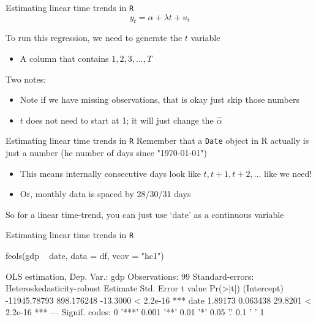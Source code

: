\documentclass[aspectratio=169,t,11pt,table]{beamer}
\begin{document}

\begin{frame}[fragile]{Estimating linear time trends in \texttt{R}}
  \vspace*{-\bigskipamount}
  $$
    y_t = \alpha + \lambda t + u_t
  $$

  To run this regression, we need to generate the $t$ variable
  \begin{itemize}
    \item A column that contains $1, 2, 3, \dots, T$
  \end{itemize}

  \bigskip
  Two notes:
  \begin{itemize}
    \item Note if we have missing observations, that is okay just skip those numbers 
    \item $t$ does not need to start at 1; it will just change the $\hat{\alpha}$
  \end{itemize}
\end{frame}

\begin{frame}[fragile]{Estimating linear time trends in \texttt{R}}
  Remember that a \texttt{Date} object in R actually is just a number (he number of days since "1970-01-01")
  \begin{itemize}
    \item This means internally consecutive days look like $t, t+1, t+2, \dots$ like we need! 
    \item Or, monthly data is spaced by 28/30/31 days
  \end{itemize}

  \bigskip
  So for a linear time-trend, you can just use `date' as a continuous variable
\end{frame}

\begin{frame}[fragile]{Estimating linear time trends in \texttt{R}}

  \begin{codeblock}
feols(gdp ~ date, data = df, vcov = "hc1")
  \end{codeblock}

  \medskip
  \begin{codeblock}[{}]
OLS estimation, Dep. Var.: gdp
Observations: 99
Standard-errors: Heteroskedasticity-robust 
                Estimate Std. Error  t value  Pr(>|t|)    
(Intercept) -11945.78793 898.176248 -13.3000 < 2.2e-16 ***
date             1.89173   0.063438  29.8201 < 2.2e-16 ***
---
Signif. codes:  0 '***' 0.001 '**' 0.01 '*' 0.05 '.' 0.1 ' ' 1
  \end{codeblock}
\end{frame}
\end{document}

